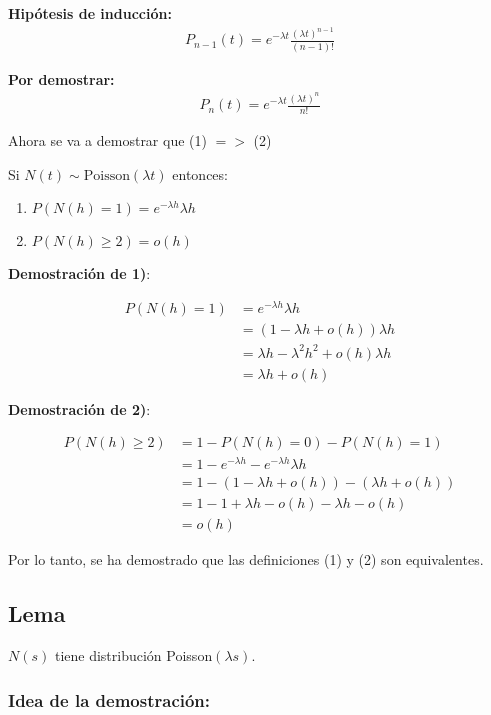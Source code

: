 \documentclass[12pt]{article}
\begin{document}
\textbf{Hipótesis de inducción:}
\begin{align*}
P_{n-1}(t) = e^{-\lambda t} \frac{(\lambda t)^{n-1}}{(n-1)!}
\end{align*}

\textbf{Por demostrar:}
\begin{align*}
P_n(t) = e^{-\lambda t} \frac{(\lambda t)^n}{n!}
\end{align*}

Ahora se va a demostrar que (1) $= >$ (2)

Si $N(t) \sim \text{Poisson}(\lambda t)$ entonces:

\begin{enumerate}
    \item $P(N(h)=1) = e^{-\lambda h} \lambda h$
    \item $P(N(h) \geq 2) = o(h)$
\end{enumerate}

\textbf{Demostración de 1)}:

\begin{align*}
P(N(h)=1) &= e^{-\lambda h} \lambda h \\
&= (1 - \lambda h + o(h)) \lambda h \\
&= \lambda h - \lambda^2 h^2 + o(h) \lambda h \\
&= \lambda h + o(h)
\end{align*}

\textbf{Demostración de 2)}:

\begin{align*}
P(N(h) \geq 2) &= 1 - P(N(h)=0) - P(N(h)=1) \\
&= 1 - e^{-\lambda h} - e^{-\lambda h} \lambda h \\
&= 1 - (1 - \lambda h + o(h)) - (\lambda h + o(h)) \\
&= 1 - 1 + \lambda h - o(h) - \lambda h - o(h) \\
&= o(h)
\end{align*}

Por lo tanto, se ha demostrado que las definiciones (1) y (2) son equivalentes.


\subsection*{Lema}

$N(s)$ tiene distribución Poisson$(\lambda s)$.

\subsubsection*{Idea de la demostración:}
\end{document}
